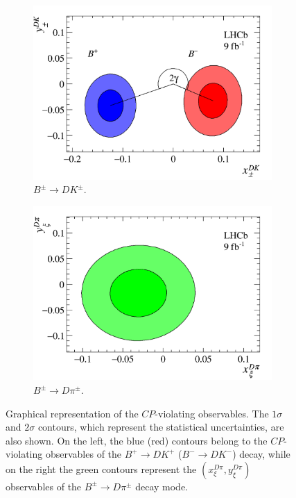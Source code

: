 \documentclass[12pt, a4paper, notitlepage, onecolumn]{article}
\begin{document}
\begin{figure}[tb]
    \centering
    \begin{subfigure}{0.5\textwidth}
        \includegraphics[width=1\textwidth]{Plots/B2DK_CP_Observables_Contours.png}
        \caption{$B^\pm\to DK^\pm$.}
        \label{figure:CP_observables_DK}
    \end{subfigure}%
    \begin{subfigure}{0.5\textwidth}
        \includegraphics[width=1\textwidth]{Plots/B2Dpi_CP_Observables_Contours.png}
        \caption{$B^\pm\to D\pi^\pm$.}
        \label{figure:CP_observables_Dpi}
    \end{subfigure}
    \caption{Graphical representation of the $C\!P$-violating observables. The $1\sigma$ and $2\sigma$ contours, which represent the statistical uncertainties, are also shown. On the left, the blue (red) contours belong to the $C\!P$-violating observables of the $B^+\to DK^+$ ($B^-\to DK^-$) decay, while on the right the green contours represent the $(x_\xi^{D\pi}, y_\xi^{D\pi})$ observables of the $B^\pm\to D\pi^\pm$ decay mode.}
    \label{figure:CP_observables}
\end{figure}
\end{document}
